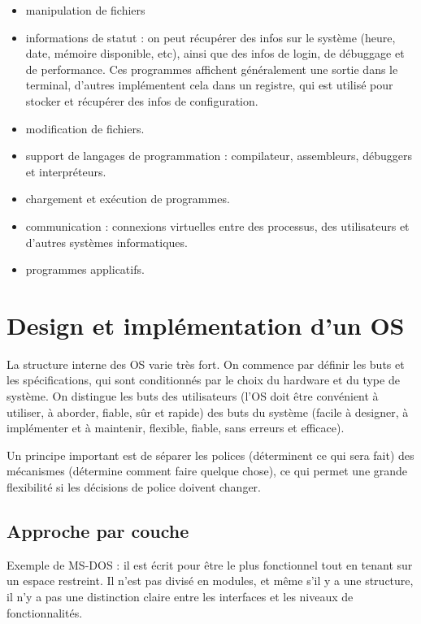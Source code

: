 \begin{itemize}
	\item manipulation de fichiers
	\item informations de statut : on peut récupérer des infos sur le système (heure, date, mémoire disponible, etc), ainsi que des infos de login, de débuggage et de performance. Ces programmes affichent généralement une sortie dans le terminal, d'autres implémentent cela dans un registre, qui est utilisé pour stocker et récupérer des infos de configuration.
	\item modification de fichiers.
	\item support de langages de programmation : compilateur, assembleurs, débuggers et interpréteurs.
	\item chargement et exécution de programmes.
	\item communication  : connexions virtuelles entre des processus, des utilisateurs et d'autres systèmes informatiques.
	\item programmes applicatifs.
\end{itemize}


\section{Design et implémentation d'un OS}

La structure interne des OS varie très fort. On commence par définir les buts et les spécifications, qui sont conditionnés par le choix du hardware et du type de système. On distingue les buts des utilisateurs (l'OS doit être convénient à utiliser, à aborder, fiable, sûr et rapide) des buts du système (facile à designer, à implémenter et à maintenir, flexible, fiable, sans erreurs et efficace).

Un principe important est de séparer les polices (déterminent ce qui sera fait) des mécanismes (détermine comment faire quelque chose), ce qui permet une grande flexibilité si les décisions de police doivent changer.

	\subsection{Approche par couche}
	
	Exemple de MS-DOS : il est écrit pour être le plus fonctionnel tout en tenant sur un espace restreint. Il n'est pas divisé en modules, et même s'il y a une structure, il n'y a pas une distinction claire entre les interfaces et les niveaux de fonctionnalités.
	
